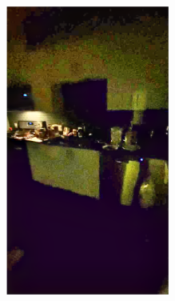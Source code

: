 \documentclass[letterpaper,12pt]{article}
\begin{document}
\begin{figure}[htbp]
\begin{subfigure}{0.128\textwidth}
			\includegraphics[width=\linewidth]{LoLi-Phone-imgT/EnlightenGAN}
			\captionsetup{font=scriptsize}
			\caption{}
			\label{fig: LoLi-Phone-imgT_j}  
		\end{subfigure}
		\begin{subfigure}{0.128\textwidth}

\end{subfigure}
\end{figure}
\end{document}
